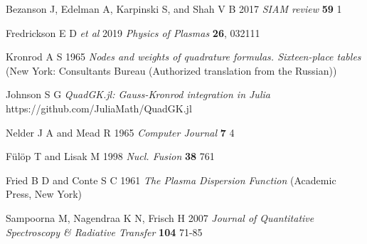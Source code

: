 \documentclass[12pt]{iopart}
\begin{document}
\begin{thebibliography}{9}
Bezanson J, Edelman A, Karpinski S, and Shah V B 2017 \textit{SIAM review} \textbf{59} 1

Fredrickson E D \textit{et al} 2019 \textit{Physics of Plasmas} \textbf{26}, 032111

Kronrod A S 1965 \textit{Nodes and weights of quadrature formulas. Sixteen-place tables} (New York: Consultants Bureau (Authorized translation from the Russian))

Johnson S G \textit{QuadGK.jl: Gauss-Kronrod integration in Julia} https://github.com/JuliaMath/QuadGK.jl

Nelder J A and Mead R 1965 \textit{Computer Journal} \textbf{7} 4

F{\"u}l{\"o}p T and Lisak M 1998 \textit{Nucl. Fusion} \textbf{38} 761

Fried B D and Conte S C 1961 \textit{The Plasma Dispersion Function} (Academic Press, New York)

Sampoorna M, Nagendraa K N, Frisch H 2007 \textit{Journal of Quantitative Spectroscopy \& Radiative Transfer} \textbf{104} 71-85


\end{thebibliography}
\end{document}
